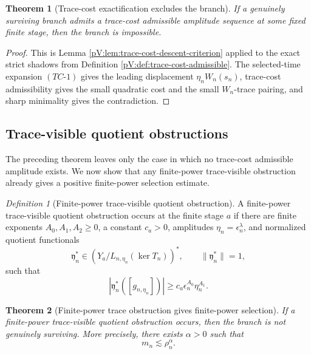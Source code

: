 \documentclass[11pt]{article}
\numberwithin{equation}{section}
\theoremstyle{plain}
\newtheorem{theorem}{Theorem}[section]
\theoremstyle{definition}
\theoremstyle{remark}
\newtheorem{definition}{Definition}[section]
\begin{document}
\begin{theorem}[Trace-cost exactification excludes the branch]
\label{pV:thm:trace-cost-exactification-excludes-branch}
If a genuinely surviving branch admits a trace-cost admissible amplitude sequence at some fixed finite stage, then the branch is impossible.
\end{theorem}

\begin{proof}
This is Lemma \ref{pV:lem:trace-cost-descent-criterion} applied to the exact strict shadows from Definition \ref{pV:def:trace-cost-admissible}.  The selected-time expansion \((TC\text{-}1)\) gives the leading displacement \(\eta_nW_n(s_n)\), trace-cost admissibility gives the small quadratic cost and the small \(W_n\)-trace pairing, and sharp minimality gives the contradiction.
\end{proof}

\subsection{Trace-visible quotient obstructions}

The preceding theorem leaves only the case in which no trace-cost admissible amplitude exists.  We now show that any finite-power trace-visible obstruction already gives a positive finite-power selection estimate.

\begin{definition}[Finite-power trace-visible quotient obstruction]
A finite-power trace-visible quotient obstruction occurs at the finite stage \(a\) if there are finite exponents \(A_0,A_1,A_2\ge0\), a constant \(c_a>0\), amplitudes \(\eta_n=\epsilon_n^\lambda\), and normalized quotient functionals
\[
        \mathfrak y_n^*
        \in
        \left(Y_a/L_{n,\eta_n}(\ker T_n)\right)^*,
        \qquad
        \|\mathfrak y_n^*\|=1,
\]
such that
\[
        |\mathfrak y_n^*([g_{n,\eta_n}])|
        \ge
        c_a\epsilon_n^{A_0}\eta_n^{A_1}.
        \tag{7.1}
\]
\end{definition}

\begin{theorem}[Finite-power trace obstruction gives finite-power selection]
\label{pV:thm:finite-power-trace-obstruction-selection}
If a finite-power trace-visible quotient obstruction occurs, then the branch is not genuinely surviving.  More precisely, there exists \(\alpha>0\) such that
\[
        m_n\lesssim \rho_n^\alpha.
\]
\end{theorem}
\end{document}
